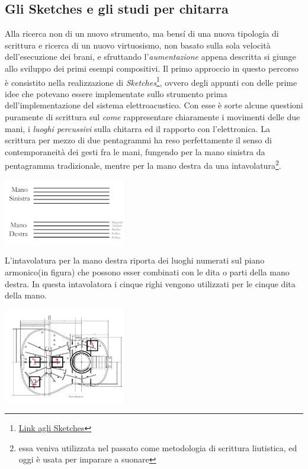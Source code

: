 \documentclass[oneside]{article}
\begin{document}
\begin{multicols*}{2}
\vfill\null
\columnbreak
\section{ Gli Sketches e gli studi per chitarra}
Alla ricerca non di un nuovo strumento, ma bensí di una nuova tipologia di scrittura e ricerca di un nuovo virtuosismo, non basato sulla sola velocità dell’esecuzione dei brani, e  sfruttando l'\textit{aumentazione} appena descritta si giunge allo sviluppo dei primi esempi compositivi.
Il primo approccio in questo percorso è consistito nella realizzazione di \textit{Sketches}\footnote{\href{https://github.com/SMERM/BN-Tedesco/blob/master/COME-02/Lezioni_in_Compresenza/20200324/Sketches.pdf}{Link agli Sketches}}, ovvero degli appunti con delle prime idee che potevano essere implementate sullo strumento prima dell'implementazione del sistema elettroacustico. Con esse è sorte alcune questioni puramente di scrittura sul \textit{come} rappresentare chiaramente i movimenti delle due mani, i \textit{luoghi percussivi} sulla chitarra ed il rapporto con l'elettronica.
La scrittura per mezzo di due pentagrammi ha reso perfettamente il senso di contemporaneità dei gesti fra le mani, fungendo per la mano sinistra da pentagramma tradizionale, mentre per la mano destra da una intavolatura\footnote{essa veniva utilizzata nel passato come metodologia di scrittura liutistica, ed oggi è usata per imparare a suonare}. 

\includegraphics[width=0.4\textwidth]{img/legenda.png}

L'intavolatura per la mano destra riporta dei luoghi numerati sul piano armonico(in figura) che possono esser combinati con le dita o parti della mano destra. In questa intavolatora i cinque righi vengono utilizzati per le cinque dita della mano. 

\includegraphics[width=0.4\textwidth]{img/luoghi_perc.png}


\end{multicols*}
\end{document}
